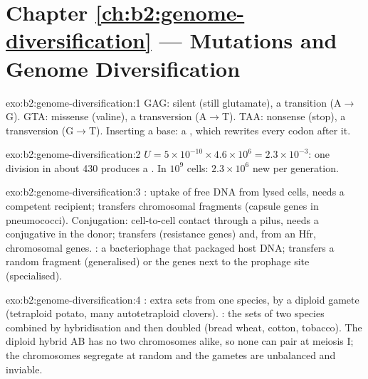 \section*{Chapter \ref{ch:b2:genome-diversification} --- Mutations and Genome Diversification}

\begin{solution}{exo:b2:genome-diversification:1}
GAG: silent (still glutamate), a transition (A$\to$G). GTA: missense
(valine), a transversion (A$\to$T). TAA: nonsense (stop), a
transversion (G$\to$T). Inserting a base: a , which
rewrites every codon after it.
\end{solution}

\begin{solution}{exo:b2:genome-diversification:2}
$U = 5\times 10^{-10}\times 4.6\times 10^{6} = 2.3\times 10^{-3}$: one
division in about 430 produces a . In $10^{9}$ cells:
$2.3\times 10^{6}$ new  per generation.
\end{solution}

\begin{solution}{exo:b2:genome-diversification:3}
: uptake of free DNA from lysed cells, needs a
competent recipient; transfers chromosomal fragments (capsule genes
in pneumococci). Conjugation: cell-to-cell contact through a pilus,
needs a conjugative  in the donor; transfers 
(resistance genes) and, from an Hfr, chromosomal genes. :
a bacteriophage that packaged host DNA; transfers a random fragment
(generalised) or the genes next to the prophage site (specialised).
\end{solution}

\begin{solution}{exo:b2:genome-diversification:4}
: extra sets from one species, by a diploid gamete
(tetraploid potato, many autotetraploid clovers). : the
sets of two species combined by hybridisation and then doubled
(bread wheat, cotton, tobacco). The diploid hybrid AB has no two
chromosomes alike, so none can pair at meiosis I; the chromosomes
segregate at random and the gametes are unbalanced and inviable.
\end{solution}

